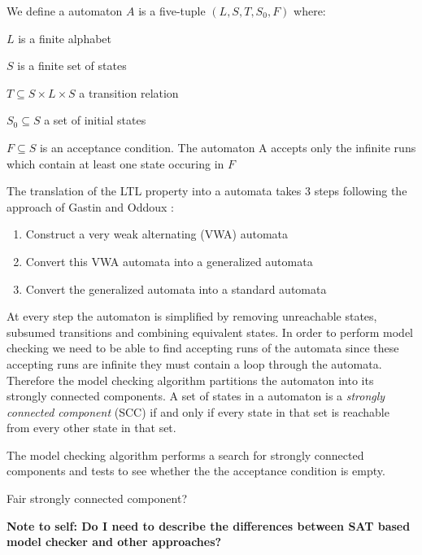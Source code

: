 \begin{mydef}
We define a \Buchi automaton $A$ is a five-tuple $(L, S,T,S_0, F)$ where:
\item $L$ is a finite alphabet
\item $S$ is a finite set of states
\item $T \subseteq S \times L \times S$ a transition relation
\item $S_0 \subseteq S$ a set of initial states 
\item $F \subseteq S$ is an acceptance condition. The automaton A accepts only the infinite runs which contain at least one state occuring in $F$
\end{mydef}

The translation of the LTL property into a \Buchi automata takes 3 steps following the approach of Gastin and Oddoux \cite{}:

\begin{enumerate}
\item Construct a very weak alternating (VWA) automata
\item Convert this VWA automata into a generalized \Buchi automata
\item Convert the generalized \Buchi automata into a standard \Buchi automata
\end{enumerate}

At every step the automaton is simplified by removing unreachable states, subsumed transitions and combining equivalent states. In order to perform model checking we need to be able to find accepting runs of the automata since these accepting runs are infinite they must contain a loop through the automata. Therefore the model checking algorithm partitions the \Buchi automaton into its strongly connected components. A set of states in a \Buchi automaton is a \emph{strongly connected component} (SCC) if and only if every state in that set is reachable from every other state in that set. 

The model checking algorithm performs a search for strongly connected components and tests to see whether the the acceptance condition is empty.

Fair strongly connected component?



\textbf{Note to self: Do I need to describe the differences between SAT based model checker and other approaches?}
